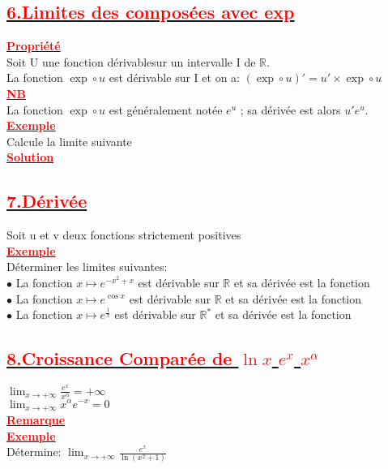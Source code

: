 \documentclass[12pt]{article}
\begin{document}
\subsection*{\underline{\textbf{\textcolor{red}{6.Limites des composées avec exp}}}}
\underline{\textbf{\textcolor{red}{Propriété}}}\\
Soit U une fonction dérivablesur un intervalle I de $\mathbb{R}$.\\
La fonction $\exp\circ u $ est dérivable sur I  et on a: $(\exp\circ u )'=u' \times \exp\circ u$\\
\underline{\textbf{\textcolor{red}{NB}}}\\
La fonction $\exp\circ u $ est généralement notée $e^{u}$ ; sa dérivée est alors $u'e^{u}$.\\
\underline{\textbf{\textcolor{red}{Exemple}}}\\
Calcule la limite suivante\\

\underline{\textbf{\textcolor{red}{Solution}}}\\
\subsection*{\underline{\textbf{\textcolor{red}{7.Dérivée}}}}
Soit u et v deux fonctions strictement positives \\

\underline{\textbf{\textcolor{red}{Exemple}}}\\
Déterminer les limites suivantes:\\
$\bullet$ La fonction $x \longmapsto e^{-x^{2}+x}$ est dérivable sur $\mathbb{R}$ et sa dérivée est la fonction\\
$\bullet$ La fonction $x \longmapsto e^{\cos x}$ est dérivable sur $\mathbb{R}$ et sa dérivée est  la fonction\\
$\bullet$ La fonction $x \longmapsto e^{\frac{1}{x}}$ est dérivable sur $\mathbb{R}^{*}$ et sa dérivée est  la fonction\\
\subsection*{\underline{\textbf{\textcolor{red}{8.Croissance Comparée de $\ln x$ $e^{x}$ $x^{\alpha}$}}}}
$\lim_{x \to +\infty}\frac{e^{x}}{x^{\alpha}}=+\infty$\\
$\lim_{x \to +\infty}x^{\alpha}e^{-x}=0$\\
\underline{\textbf{\textcolor{red}{Remarque}}}\\
\underline{\textbf{\textcolor{red}{Exemple}}}\\
Détermine: $\lim_{x \to +\infty}\frac{e^{x}}{\ln(x^{2}+1)}$
\end{document}
